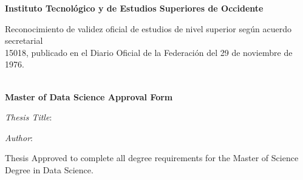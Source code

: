 \begin{fullwidth}
    \begin{center}
        \LARGE
        \textcolor{itesodblue}{\textbf{Instituto Tecnol\'ogico y de Estudios Superiores de Occidente}}\\
        
        \vspace*{0.1cm}
        
        \normalsize
        \textcolor{itesodblue}{Reconocimiento de validez oficial de estudios de nivel superior según acuerdo secretarial \\15018, publicado en el Diario Oficial de la Federación del 29 de noviembre de 1976.}\\
        
        \vspace*{0.5cm}
        
        \LARGE
        \textcolor{itesodblue}{\mydepartament}\\
        \textcolor{itesodblue}{\textbf{Master of Data Science Approval Form}}
        
        \vspace*{1cm}
        
        \LARGE
        \textcolor{itesodblue}{\textit{Thesis Title}: \textbf{\mytitle}}
        
        \textcolor{itesodblue}{\textit{Author}: \textbf{\myauthor}}
        
        \Large
        \textcolor{itesodblue}{Thesis Approved to complete all degree requirements for the Master of Science Degree in Data Science.}
        

\end{center}
\end{fullwidth}
